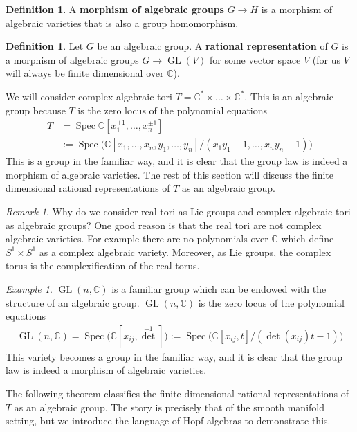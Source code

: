 \documentclass{amsart}
\DeclareMathOperator{\GL}{GL}
\newcommand{\C}{\mathbb{C}}
\DeclareMathOperator{\Spec}{Spec}
\newcommand{\inv}[1]{{#1}^{-1}}
\numberwithin{equation}{section}
\theoremstyle{plain} %
\theoremstyle{definition}
\newtheorem{definition}[equation]{Definition}
\theoremstyle{remark}
\newtheorem{remark}[equation]{Remark}
\newtheorem{example}[equation]{Example}
\begin{document}
\begin{definition}
	A \textbf{morphism of algebraic groups} $G\to H$ is a morphism of algebraic varieties that is also a group homomorphism.
\end{definition}

\begin{definition}
	Let $G$ be an algebraic group. A \textbf{rational representation} of $G$ is a morphism of algebraic groups
	$G\to \GL(V)$ for some vector space $V$ (for us $V$ will always be finite dimensional over $\C$).
\end{definition}

We will consider complex algebraic tori $T = \C^* \times \dots \times \C^*$.
This is an algebraic group because $T$ is the zero locus of
the polynomial equations \begin{align*}
	T &= \Spec \C[x_1^{\pm 1},\ldots, x_n^{\pm 1}] \\
	&:= \Spec\big(\C[x_1,\dots,x_n,y_1,\dots,y_n]/(x_1y_1-1,\dots,x_ny_n-1)\big)
\end{align*} This is a group in the familiar way,
and it is clear that the group law is indeed a morphism of algebraic varieties. The rest of this section will discuss
the finite dimensional rational representations of $T$ as an algebraic group.

\begin{remark}
	Why do we consider real tori as Lie groups and complex algebraic tori as algebraic groups? One good reason is that the real tori 
	are not complex algebraic varieties. For example there are no polynomials over $\C$ which define $S^1\times S^1$ as a complex algebraic variety.
	Moreover, as Lie groups, the complex torus is the complexification of the real torus.
\end{remark}

\begin{example}
	$\GL(n,\C)$ is a familiar group which can be endowed with the structure of an algebraic group.
	$\GL(n,\C)$ is the zero locus of the polynomial equations
	\begin{align*}
		\GL(n,\C) = \Spec \big(\C[x_{ij},\inv{\det}]\big) := \Spec\big(\C[x_{ij},t]/(\det(x_{ij})t-1)\big)
	\end{align*} This variety becomes a group in the familiar way,
	and it is clear that the group law is indeed a morphism of algebraic varieties.
\end{example}

The following theorem classifies
the finite dimensional rational representations of $T$ as an algebraic group.
The story is precisely that of the smooth manifold setting, but we introduce the language of Hopf algebras to demonstrate this.
\end{document}
